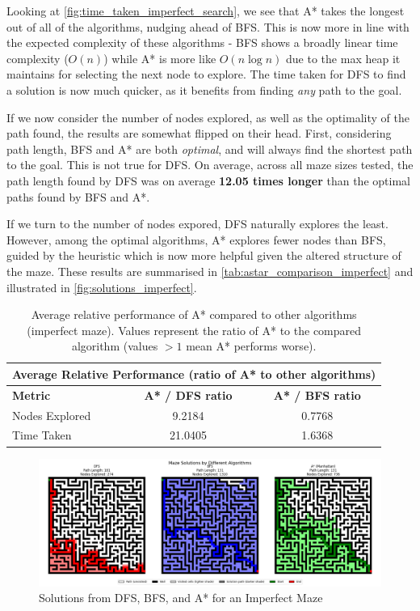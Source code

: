\documentclass{article}
\begin{document}
Looking at \autoref{fig:time_taken_imperfect_search}, we see that A* takes the longest out of all of the algorithms, nudging ahead of BFS. This is now more in line with the expected complexity of these algorithms - BFS shows a broadly linear time complexity ($O(n)$) while A* is more like $O(n \log n)$ due to the max heap it maintains for selecting the next node to explore. The time taken for DFS to find a solution is now much quicker, as it benefits from finding \textit{any} path to the goal.

If we now consider the number of nodes explored, as well as the optimality of the path found, the results are somewhat flipped on their head. First, considering path length, BFS and A* are both \textit{optimal}, and will always find the shortest path to the goal. This is not true for DFS. On average, across all maze sizes tested, the path length found by DFS was on average \textbf{12.05 times longer} than the optimal paths found by BFS and A*.

If we turn to the number of nodes expored, DFS naturally explores the least. However, among the optimal algorithms, A* explores fewer nodes than BFS, guided by the heuristic which is now more helpful given the altered structure of the maze. These results are summarised in \autoref{tab:astar_comparison_imperfect} and illustrated in \autoref{fig:solutions_imperfect}.
\begin{table}[h]
    \centering
    \begin{tabular}{|l|c|c|}
        \hline
        \multicolumn{3}{|c|}{\textbf{Average Relative Performance (ratio of A* to other algorithms)}} \\
        \hline
        \textbf{Metric} & \textbf{A* / DFS ratio} & \textbf{A* / BFS ratio} \\
        \hline
        Nodes Explored & 9.2184 & 0.7768 \\
        \hline
        Time Taken & 21.0405 & 1.6368 \\
        \hline
    \end{tabular}
    \caption{Average relative performance of A* compared to other algorithms (imperfect maze). Values represent the ratio of A* to the compared algorithm (values $> 1$ mean A* performs worse).}
    \label{tab:astar_comparison_imperfect}
\end{table}

\begin{figure}[h]
    \centering
    \includegraphics[width=\textwidth]{imperfect maze solutions search.png}
    \caption{Solutions from DFS, BFS, and A* for an Imperfect Maze}
    \label{fig:solutions_imperfect}
\end{figure}
\end{document}

